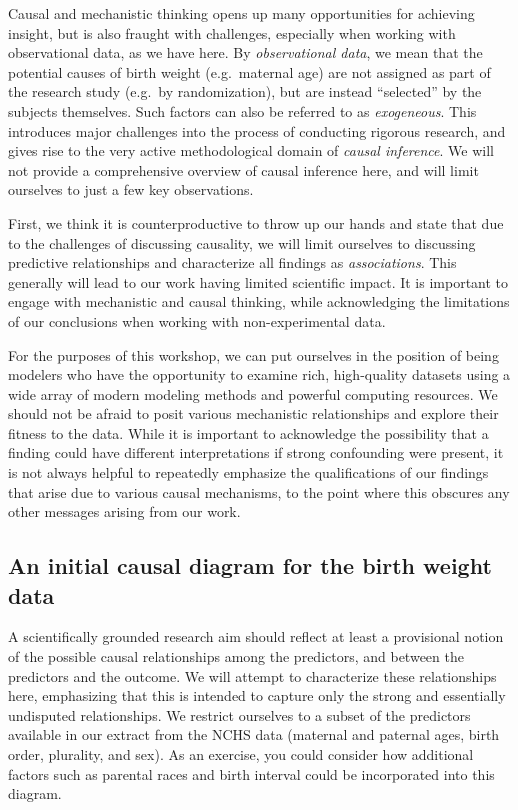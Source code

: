 Causal and mechanistic thinking opens up many opportunities for achieving insight, but is also fraught with challenges, especially when working with observational data, as we have here.  By {\em observational data}, we mean that the potential causes of birth weight (e.g.\ maternal age) are not assigned as part of the research study (e.g.\ by randomization), but are instead ``selected'' by the subjects themselves.  Such factors can also be referred to as {\em exogeneous}.  This introduces major challenges into the process of conducting rigorous research, and gives rise to the very active methodological domain of {\em causal inference}. We will not provide a comprehensive overview of causal inference here, and will limit ourselves to just a few key observations.

First, we think it is counterproductive to throw up our hands and state that due to the challenges of discussing causality, we will limit ourselves to discussing predictive relationships and characterize all findings as {\em associations}.  This generally will lead to our work having limited scientific impact.  It is important to engage with mechanistic and causal thinking, while acknowledging the limitations of our conclusions when working with non-experimental data.

For the purposes of this workshop, we can put ourselves in the position of being modelers who have the opportunity to examine rich, high-quality datasets using a wide array of modern modeling methods and powerful computing resources.  We should not be afraid to posit various mechanistic relationships and explore their fitness to the data.  While it is important to acknowledge the possibility that a finding could have different interpretations if strong confounding were present, it is not always helpful to repeatedly emphasize the qualifications of our findings that arise due to various causal mechanisms, to the point where this obscures any other messages arising from our work.

\subsection{An initial causal diagram for the birth weight data \label{cdiag}}

A scientifically grounded research aim should reflect at least a provisional notion of the possible causal relationships among the predictors, and between the predictors and the outcome.  We will attempt to characterize these relationships here, emphasizing that this is intended to capture only the strong and essentially undisputed relationships.  We restrict ourselves to a subset of the predictors available in our extract from the NCHS data (maternal and paternal ages, birth order, plurality, and sex).  As an exercise, you could consider how additional factors such as parental races and birth interval could be incorporated into this diagram.

